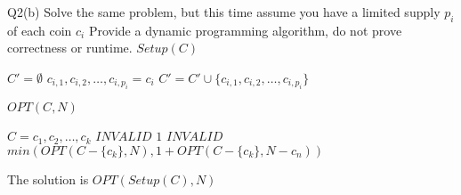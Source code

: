 \begin{problem}
  {Q2(b)}
  Solve the same problem, but this time assume you have a limited supply $p_i$ of each coin $c_i$
  Provide a dynamic programming algorithm, do not prove correctness or runtime.
  $Setup(C)$
  \begin{algorithmic}[1]
      \STATE $C' = \emptyset$
      \STATE $c_{i,1}, c_{i, 2}, \dots, c_{i, p_i} = c_i$
      \STATE $C' = C' \cup \{c_{i, 1}, c_{i, 2}, \dots, c_{i, p_i}\}$
      \ENDFOR
  \end{algorithmic}
  $OPT(C, N)$
  \begin{algorithmic}[1]
      \STATE $C = c_1, c_2, \dots, c_k$
      \RETURN $INVALID$
      \ENDIF
      \RETURN $1$
      \ENDIF
      \RETURN $INVALID$
      \ENDIF
      \RETURN $min(OPT(C - \{c_k\}, N), 1 + OPT(C - \{c_k\}, N-c_n))$
  \end{algorithmic}
  The solution is $OPT(Setup(C), N)$
\end{problem}
